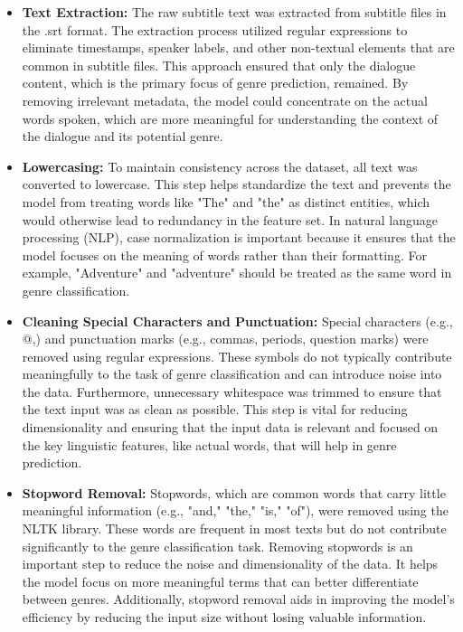 \documentclass[conference]{IEEEtran}
\begin{document}
\begin{itemize}
    \item \textbf{Text Extraction:} The raw subtitle text was extracted from subtitle files in the .srt format. The extraction process utilized regular expressions to eliminate timestamps, speaker labels, and other non-textual elements that are common in subtitle files. This approach ensured that only the dialogue content, which is the primary focus of genre prediction, remained. By removing irrelevant metadata, the model could concentrate on the actual words spoken, which are more meaningful for understanding the context of the dialogue and its potential genre.

    \item \textbf{Lowercasing:} To maintain consistency across the dataset, all text was converted to lowercase. This step helps standardize the text and prevents the model from treating words like "The" and "the" as distinct entities, which would otherwise lead to redundancy in the feature set. In natural language processing (NLP), case normalization is important because it ensures that the model focuses on the meaning of words rather than their formatting. For example, "Adventure" and "adventure" should be treated as the same word in genre classification.

    \item \textbf{Cleaning Special Characters and Punctuation:} Special characters (e.g., @,) and punctuation marks (e.g., commas, periods, question marks) were removed using regular expressions. These symbols do not typically contribute meaningfully to the task of genre classification and can introduce noise into the data. Furthermore, unnecessary whitespace was trimmed to ensure that the text input was as clean as possible. This step is vital for reducing dimensionality and ensuring that the input data is relevant and focused on the key linguistic features, like actual words, that will help in genre prediction.

    \item \textbf{Stopword Removal:} Stopwords, which are common words that carry little meaningful information (e.g., "and," "the," "is," "of"), were removed using the NLTK library. These words are frequent in most texts but do not contribute significantly to the genre classification task. Removing stopwords is an important step to reduce the noise and dimensionality of the data. It helps the model focus on more meaningful terms that can better differentiate between genres. Additionally, stopword removal aids in improving the model’s efficiency by reducing the input size without losing valuable information.


\end{itemize}
\end{document}
